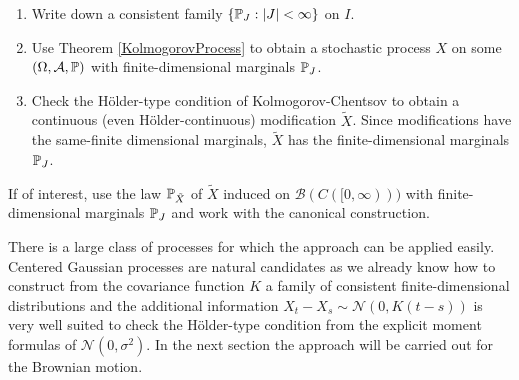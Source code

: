 \begin{lwarnhinweis}
	\begin{enumerate}[label=(\roman*)]
		\item Write down a consistent family $\{\P_J:|J|<\infty\}$ on $I$.
		\item Use Theorem \ref{KolmogorovProcess} to obtain a stochastic process $X$ on some $(\Omega, \mathcal A, \P)$ with finite-dimensional marginals $\P_J$.
		\item Check the H\"older-type condition of Kolmogorov-Chentsov to obtain a continuous (even H\"older-continuous) modification $\tilde X$. Since modifications have the same-finite dimensional marginals, $\tilde X$ has the finite-dimensional marginals $\P_J$. 
		\end{enumerate}
		If of interest, use the law $\P_{\tilde X}$ of $\tilde X$ induced on $\mathcal B(C([0,\infty)))$ with finite-dimensional marginals $\P_J$ and work with the canonical construction.
	\end{lwarnhinweis}
	There is a large class of processes for which the approach can be applied easily. Centered Gaussian processes are natural candidates as we already know how to construct from the covariance function $K$ a family of consistent finite-dimensional distributions and the additional information $X_t-X_s\sim \mathcal N(0,K(t-s))$ is very well suited to check the H\"older-type condition from the explicit moment formulas of $\mathcal N(0,\sigma^2)$. In the next section the approach will be carried out for the Brownian motion.

